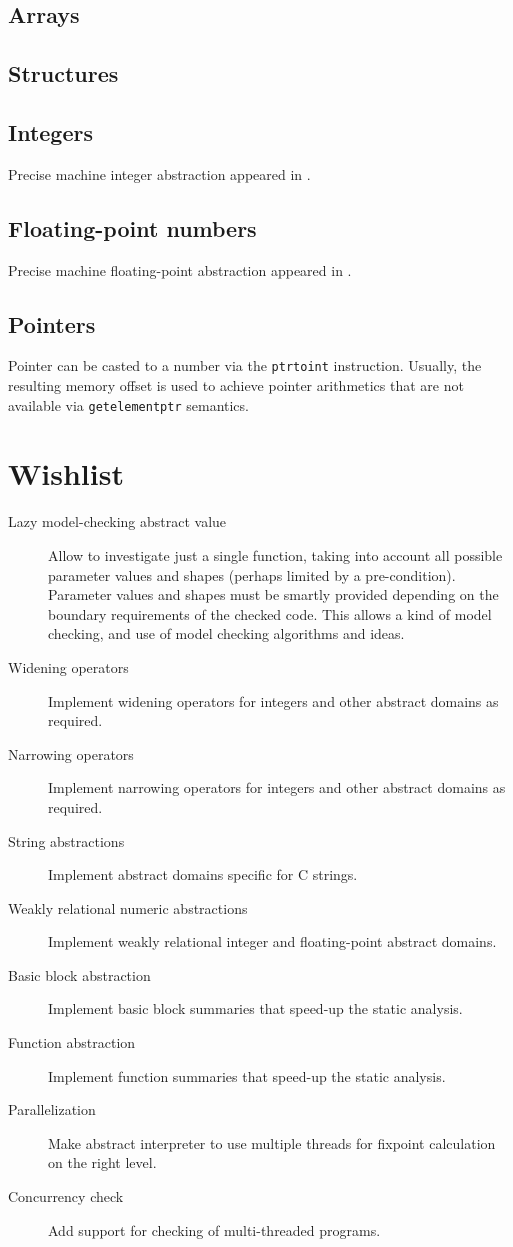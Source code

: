 \documentclass[a4paper]{book}
\begin{document}
\section{Arrays}

\section{Structures}

\section{Integers}
Precise machine integer abstraction appeared in \cite{M12}.

\section{Floating-point numbers}
Precise machine floating-point abstraction appeared in \cite{M12}.

\section{Pointers}
Pointer can be casted to a number via the \texttt{ptrtoint}
instruction.  Usually, the resulting memory offset is used to achieve
pointer arithmetics that are not available via \texttt{getelementptr}
semantics.

\chapter{Wishlist}
\begin{description}
\item[Lazy model-checking abstract value] Allow to investigate just a
  single function, taking into account all possible parameter values
  and shapes (perhaps limited by a pre-condition).  Parameter values
  and shapes must be smartly provided depending on the boundary
  requirements of the checked code.  This allows a kind of model
  checking, and use of model checking algorithms and ideas.
\item[Widening operators] Implement widening operators for integers
  and other abstract domains as required.
\item[Narrowing operators] Implement narrowing operators for integers
  and other abstract domains as required.
\item[String abstractions] Implement abstract domains specific for C
  strings.
\item[Weakly relational numeric abstractions] Implement weakly
  relational integer and floating-point abstract domains.
\item[Basic block abstraction] Implement basic block summaries that
  speed-up the static analysis.
\item[Function abstraction] Implement function summaries that speed-up
  the static analysis.
\item[Parallelization] Make abstract interpreter to use multiple
  threads for fixpoint calculation on the right level.
\item[Concurrency check] Add support for checking of multi-threaded
  programs.
\end{description}
\end{document}
